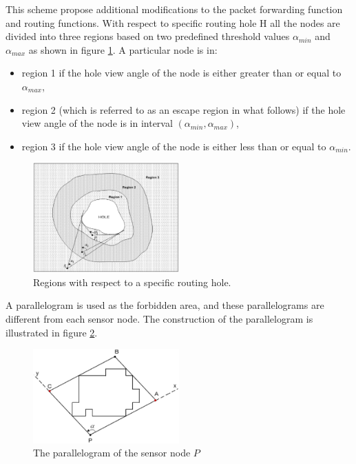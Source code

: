 This scheme propose additional modifications to the packet forwarding function and routing functions. With respect to specific routing hole H all the nodes are divided into three regions based on two predefined threshold values $\alpha_{min}$ and $\alpha_{max}$ as shown in figure \ref{fig-elbar-regions}. A particular node is in:
\begin{itemize}
\item region 1 if the hole view angle of the node is either greater than or equal to $\alpha_{max}$,
\item region 2 (which is referred to as an escape region in what follows) if the hole view angle of the node is in interval $(\alpha_{min}, \alpha_{max})$,
\item region 3 if the hole view angle of the node is either less than or equal to $\alpha_{min}$.
\end{itemize}

\begin{figure}[!htb]
\centering
\includegraphics[width=0.5\textwidth]{Chapter3/Chapter3Figs/fig-elbar-regions.eps}
\caption{Regions with respect to a specific routing hole.}
\label{fig-elbar-regions}
\end{figure}

A parallelogram is used as the forbidden area, and these parallelograms are different from each sensor node. The construction of the parallelogram is illustrated in figure \ref{fig-elbar-parallelogram}.

\begin{figure}[!htb]
\centering
\includegraphics[width=0.5\textwidth]{Chapter3/Chapter3Figs/fig-elbar-parallelogram.eps}
\caption{The parallelogram of the sensor node $P$}
\label{fig-elbar-parallelogram}
\end{figure}

